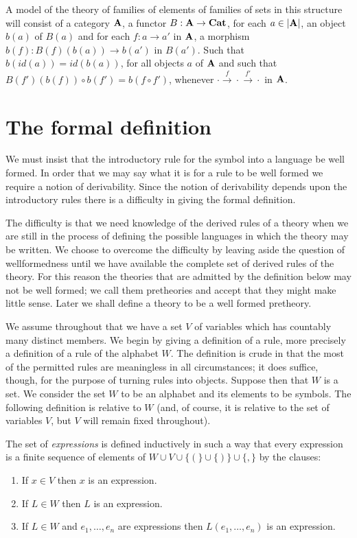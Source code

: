 A model of the theory of families of elements of families of sets in this structure will consist of a category $\mathbf{A}$, a functor $B:\mathbf{A}\to\mathbf{Cat}$, for each $a\in |\mathbf{A}|$, an object $b(a)$ of $B(a)$ and for each $f:a\to a'$ in $\mathbf{A}$, a morphism $b(f): B(f)(b(a))\to b(a')$ in $B(a')$.
%
Such that $b(id(a)) = id(b(a))$, for all objects $a$ of $\mathbf{A}$ and such that $B(f')(b(f))\circ b(f') = b(f\circ f')$, whenever $\cdot\xrightarrow{f}\cdot\xrightarrow{f'}\cdot$ in $\mathbf{A}$.

\section{The formal definition} \label{sec:source-1-6}
We must insist that the introductory rule for the symbol into a language be well formed.
%
In order that we may say what it is for a rule to be well formed we require a notion of derivability.
%
Since the notion of derivability depends upon the introductory rules there is a difficulty in giving the formal definition.

The difficulty is that we need knowledge of the derived rules of a theory when we are still in the process of defining the possible languages in which the theory may be written.
%
We choose to overcome the difficulty by leaving aside the question of wellformedness until we have available the complete set of derived rules of the theory.
%
For this reason the theories that are admitted by the definition below may not be well formed; we call them pretheories and accept that they might make little sense.
%
Later we shall define a theory to be a well formed pretheory.

We assume throughout that we have a set $V$ of variables which has countably many distinct members.
%
We begin by giving a definition of a rule, more precisely a definition of a rule of the alphabet $W$.
%
The definition is crude in that the most of the permitted rules are meaningless in all circumstances; it does suffice, though, for the purpose of turning rules into objects. Suppose then that $W$ is a set.
%
We consider the set $W$ to be an alphabet and its elements to be symbols.
%
The following definition is relative to $W$ (and, of course, it is relative to the set of variables $V$, but $V$ will remain fixed throughout).

The set of \emph{expressions} is defined inductively in such a way that every expression is a finite sequence of elements of $W\cup V\cup \{(\}\cup\{)\}\cup\{,\}$ by the clauses:
%
\begin{enumerate}
  \item If $x\in V$ then $x$ is an expression.
  \item If $L\in W$ then $L$ is an expression.
  \item If $L\in W$ and $e_1,\ldots,e_n$ are expressions then $L(e_1,\ldots,e_n)$ is an expression.
\end{enumerate}

